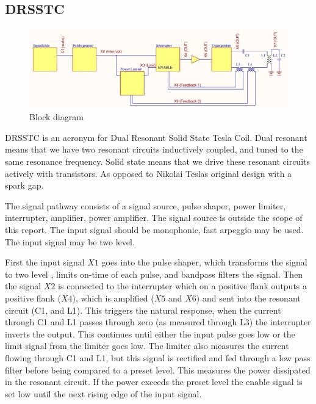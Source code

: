 \subsection{DRSSTC}

\begin{figure}
    \centering
    \includegraphics[width=\textwidth]{img/FunksjonsBlokkskjema.pdf}
    \caption{Block diagram}
    \label{fig:func_block}
\end{figure}

DRSSTC is an acronym for Dual Resonant Solid State Tesla Coil. Dual resonant means that we have two resonant circuits inductively coupled, and tuned to the same resonance frequency. Solid state means that we drive these resonant circuits actively with transistors.  As opposed to Nikolai Teslas original design with a spark gap.

The signal pathway consists of a signal source, pulse shaper, power limiter, interrupter, amplifier, power amplifier.
The signal source is outside the scope of this report.
The input signal should be monophonic, fast arpeggio  may be used. The input signal may be two level.

First the input signal $X1$ goes into the pulse shaper, which transforms the signal to two level , limits on-time of each pulse, and bandpass filters the signal. Then the signal $X2$ is connected to the interrupter which on a positive flank outputs a positive flank ($X4$), which is amplified ($X5$ and $X6$) and sent into the resonant circuit (C1, and L1). This triggers the natural response, when the current through C1 and L1 passes through zero (as measured through L3) the interrupter inverts the output. This continues until either the input pulse goes low or the limit signal from the limiter goes low.
The limiter also measures the current flowing through C1 and L1, but this signal is rectified and fed through a low pass filter before being compared to a preset level. This measures the power dissipated in the resonant circuit. If the power exceeds the preset level the enable signal is set low until the next rising edge of the input signal.

